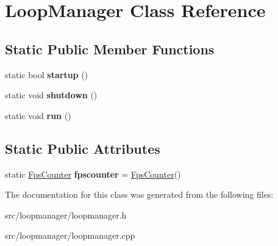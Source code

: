 \hypertarget{class_loop_manager}{}\section{Loop\+Manager Class Reference}
\label{class_loop_manager}
\subsection*{Static Public Member Functions}
\begin{DoxyCompactItemize}
\item 
\hypertarget{class_loop_manager_a4ca8d126c9956409dce8bc0e40f84467}{}static bool {\bfseries startup} ()\label{class_loop_manager_a4ca8d126c9956409dce8bc0e40f84467}

\item 
\hypertarget{class_loop_manager_abc3cf29ae86499bebc44b593d28bce9c}{}static void {\bfseries shutdown} ()\label{class_loop_manager_abc3cf29ae86499bebc44b593d28bce9c}

\item 
\hypertarget{class_loop_manager_a0afee72f2533a652fd4f5890b8c87bf6}{}static void {\bfseries run} ()\label{class_loop_manager_a0afee72f2533a652fd4f5890b8c87bf6}

\end{DoxyCompactItemize}
\subsection*{Static Public Attributes}
\begin{DoxyCompactItemize}
\item 
\hypertarget{class_loop_manager_a212ed67228f5ad6f2069cdd7e7c1c8b6}{}static \hyperlink{class_fps_counter}{Fps\+Counter} {\bfseries fpscounter} = \hyperlink{class_fps_counter}{Fps\+Counter}()\label{class_loop_manager_a212ed67228f5ad6f2069cdd7e7c1c8b6}

\end{DoxyCompactItemize}


The documentation for this class was generated from the following files\+:\begin{DoxyCompactItemize}
\item 
src/loopmanager/loopmanager.\+h\item 
src/loopmanager/loopmanager.\+cpp\end{DoxyCompactItemize}
